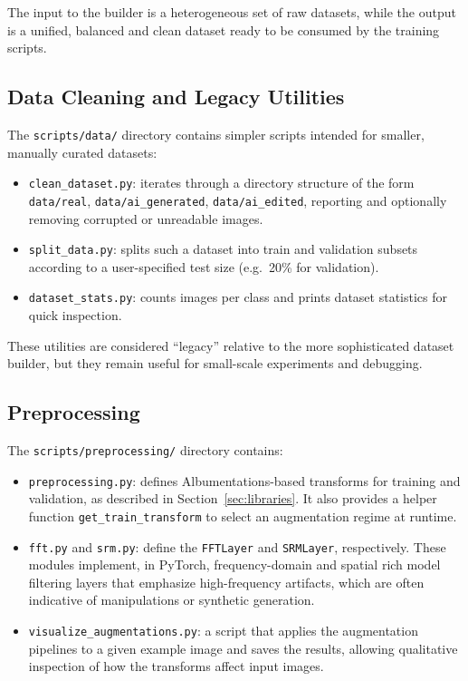 The input to the builder is a heterogeneous set of raw datasets, while the output is a unified, balanced and clean dataset ready to be consumed by the training scripts.

\subsection{Data Cleaning and Legacy Utilities}

The \texttt{scripts/data/} directory contains simpler scripts intended for smaller, manually curated datasets:
\begin{itemize}
  \item \texttt{clean\_dataset.py}: iterates through a directory structure of the form \texttt{data/real}, \texttt{data/ai\_generated}, \texttt{data/ai\_edited}, reporting and optionally removing corrupted or unreadable images.
  \item \texttt{split\_data.py}: splits such a dataset into train and validation subsets according to a user-specified test size (e.g.\ 20\% for validation).
  \item \texttt{dataset\_stats.py}: counts images per class and prints dataset statistics for quick inspection.
\end{itemize}

These utilities are considered ``legacy'' relative to the more sophisticated dataset builder, but they remain useful for small-scale experiments and debugging.

\subsection{Preprocessing}

The \texttt{scripts/preprocessing/} directory contains:
\begin{itemize}
  \item \texttt{preprocessing.py}: defines Albumentations-based transforms for training and validation, as described in Section~\ref{sec:libraries}. It also provides a helper function \texttt{get\_train\_transform} to select an augmentation regime at runtime.
  \item \texttt{fft.py} and \texttt{srm.py}: define the \texttt{FFTLayer} and \texttt{SRMLayer}, respectively. These modules implement, in PyTorch, frequency-domain and spatial rich model filtering layers that emphasize high-frequency artifacts, which are often indicative of manipulations or synthetic generation.
  \item \texttt{visualize\_augmentations.py}: a script that applies the augmentation pipelines to a given example image and saves the results, allowing qualitative inspection of how the transforms affect input images.
\end{itemize}

